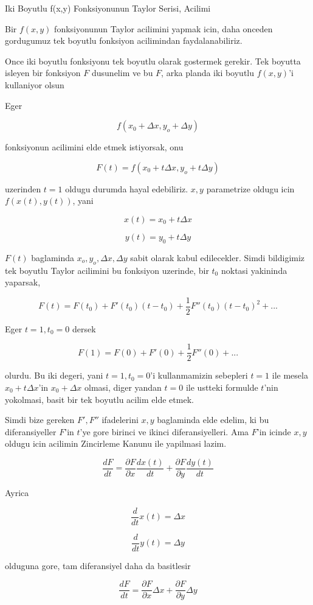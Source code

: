 \documentclass[12pt,fleqn]{article}
\begin{document}
Iki Boyutlu f(x,y) Fonksiyonunun Taylor Serisi, Acilimi

Bir $f(x,y)$ fonksiyonunun Taylor acilimini yapmak icin, daha onceden
gordugumuz tek boyutlu fonksiyon acilimindan faydalanabiliriz. 

Once iki boyutlu fonksiyonu tek boyutlu olarak gostermek gerekir. Tek
boyutta isleyen bir fonksiyon $F$ dusunelim ve bu $F$, arka planda iki
boyutlu $f(x,y)$'i kullaniyor olsun

Eger 

\[ f(x_0 +\Delta x, y_o + \Delta y) \]

fonksiyonun acilimini elde etmek istiyorsak, onu

\[ F(t) = f(x_0 + t\Delta x, y_o + t\Delta y) \]

uzerinden $t=1$ oldugu durumda hayal edebiliriz. $x,y$ parametrize 
oldugu icin  $f(x(t),y(t))$, yani

\[ x(t) = x_0 + t\Delta x \]

\[ y(t) = y_0 + t\Delta y \]

$F(t)$ baglaminda $x_o, y_o, \Delta x, \Delta y$ sabit olarak kabul edilecekler. Simdi bildigimiz
tek boyutlu Taylor acilimini bu fonksiyon uzerinde, bir $t_0$ noktasi yakininda 
yaparsak,

\[ F(t) = F(t_0) + F'(t_0)(t-t_0) + \frac{1}{2}F''(t_0)(t-t_0)^2 + ... \]

Eger $t=1,t_0=0$ dersek

\[ F(1) = F(0) + F'(0) + \frac{1}{2}F''(0) + ... \]

olurdu. Bu iki degeri, yani $t=1,t_0=0$'i kullanmamizin sebepleri $t=1$ ile
mesela $x_0 + t\Delta x$'in $x_0 + \Delta x$ olmasi, diger yandan $t=0$ ile
ustteki formulde $t$'nin yokolmasi, basit bir tek boyutlu acilim elde
etmek.

Simdi bize gereken $F',F''$ ifadelerini $x,y$ baglaminda elde edelim, ki bu
diferansiyeller $F$'in $t$'ye gore birinci ve ikinci diferansiyelleri. Ama
$F$'in icinde $x,y$ oldugu icin acilimin Zincirleme Kanunu ile yapilmasi
lazim.

\[ \frac{dF}{dt} = \frac{\partial F}{\partial x}\frac{dx(t)}{dt} +
\frac{\partial F}{\partial y}\frac{dy(t)}{dt} 
 \]

Ayrica

\[ \frac{d}{dt}x(t) = \Delta x \]

\[ \frac{d}{dt}y(t) = \Delta y \]

olduguna gore, tam diferansiyel daha da basitlesir

\[ \frac{dF}{dt} = \frac{\partial F}{\partial x}\Delta x +
\frac{\partial F}{\partial y}\Delta y
 \]
\end{document}
